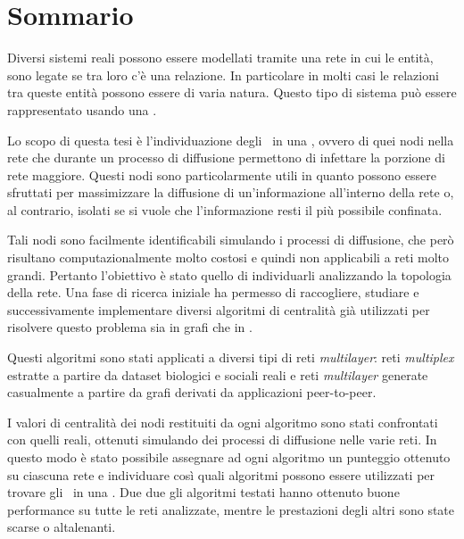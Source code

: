 \setlength{\parskip}{1em}

\chapter*{Sommario} %
\label{sommario}


Diversi sistemi reali possono essere modellati tramite una rete in cui
le entità, sono legate se tra loro c'è una relazione. 
In particolare in molti casi le relazioni tra queste entità possono essere 
di varia natura. Questo tipo di sistema può essere rappresentato usando una 
\muln.

Lo scopo di questa tesi è l'individuazione degli \infsp\ in una \muln, 
ovvero di quei nodi nella rete che durante un processo di diffusione 
permettono di infettare la porzione di rete maggiore. 
Questi nodi sono particolarmente utili in quanto possono essere sfruttati per 
massimizzare la diffusione di un'informazione all'interno della rete o, al contrario, 
isolati se si vuole che l'informazione resti il più possibile confinata.

Tali nodi sono facilmente identificabili simulando i processi di diffusione, 
che però risultano computazionalmente molto costosi e quindi 
non applicabili a reti molto grandi.
Pertanto l'obiettivo è stato quello di individuarli analizzando la topologia 
della rete.
Una fase di ricerca iniziale ha permesso di raccogliere, studiare 
e successivamente implementare diversi 
algoritmi di centralità già utilizzati per risolvere questo problema 
sia in grafi che in \mulns.

Questi algoritmi sono stati applicati a diversi tipi di reti \textit{multilayer}:
reti \textit{multiplex} estratte a partire da dataset biologici e 
sociali reali e reti \textit{multilayer} generate casualmente 
a partire da grafi derivati da applicazioni peer-to-peer.

I valori di centralità dei nodi restituiti da ogni algoritmo sono stati 
confrontati con quelli reali, ottenuti simulando dei processi di diffusione
nelle varie reti. In questo modo è stato possibile assegnare ad ogni algoritmo
un punteggio ottenuto su ciascuna rete e individuare così quali algoritmi
possono essere utilizzati per trovare gli \infsp\ in una \muln.
Due due gli algoritmi testati hanno ottenuto buone performance su tutte le 
reti analizzate, mentre le prestazioni degli altri sono state scarse o altalenanti.


